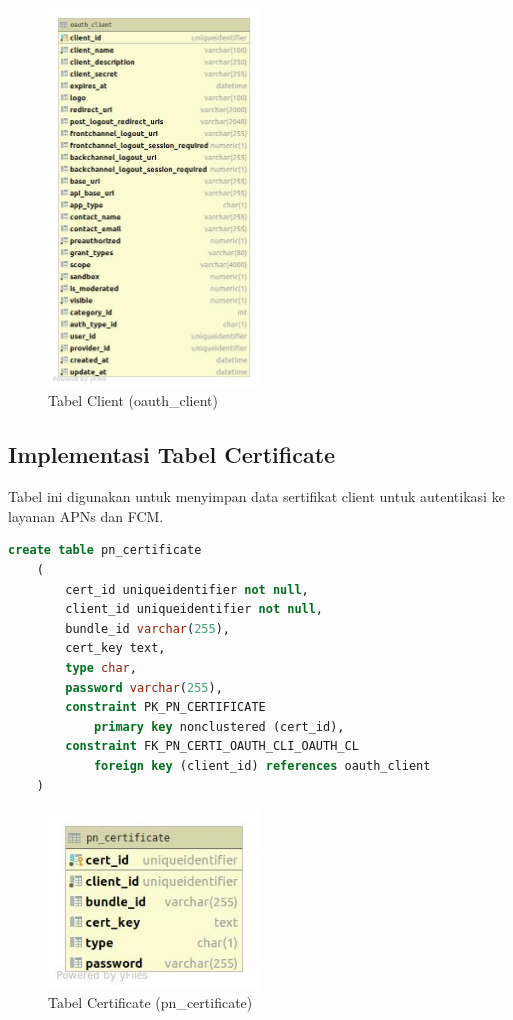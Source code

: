 \begin{figure}[H]
    \centering\includegraphics[width=0.5\textwidth]{bab4/figures/tabel_oauth_client.jpg}
    \caption{Tabel Client (oauth\_client)}
    \label{tabel_oauth_client}
\end{figure}

\subsection{Implementasi Tabel Certificate}
\par Tabel ini digunakan untuk menyimpan data sertifikat client untuk autentikasi ke layanan APNs dan FCM.
\begin{lstlisting}[language=sql, firstnumber=1, caption=Implementasi Tabel Certificate]
    create table pn_certificate
    (
        cert_id uniqueidentifier not null,
        client_id uniqueidentifier not null,
        bundle_id varchar(255),
        cert_key text,
        type char,
        password varchar(255),
        constraint PK_PN_CERTIFICATE
            primary key nonclustered (cert_id),
        constraint FK_PN_CERTI_OAUTH_CLI_OAUTH_CL
            foreign key (client_id) references oauth_client
    )
\end{lstlisting}
\begin{figure}[H]
    \centering\includegraphics[width=0.5\textwidth]{bab4/figures/tabel_pn_certificate.jpg}
    \caption{Tabel Certificate (pn\_certificate)}
    \label{tabel_pn_certificate}
\end{figure}

